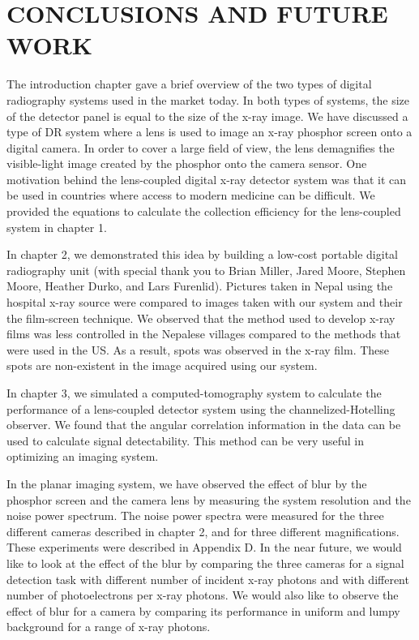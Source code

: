 \chapter{CONCLUSIONS AND FUTURE WORK}
The introduction chapter gave a brief overview of the two types of digital radiography systems used in the market today.  In both types of systems, the size of the detector panel is equal to the size of the x-ray image.  We have discussed a type of DR system where a lens is used to image an x-ray phosphor screen onto a digital camera.  In order to cover a large field of view, the lens demagnifies the visible-light image created by the phosphor onto the camera sensor.  One motivation behind the lens-coupled digital x-ray detector system was that it can be used in countries where access to modern medicine can be difficult.  We provided the equations to calculate the collection efficiency for the lens-coupled system in chapter 1.  

In chapter 2, we demonstrated this idea by building a low-cost portable digital radiography unit (with special thank you to Brian Miller, Jared Moore, Stephen Moore, Heather Durko, and Lars Furenlid).  Pictures taken in Nepal using the hospital x-ray source were compared to images taken with our system and their the film-screen technique.  We observed that the method used to develop x-ray films was less controlled in the Nepalese villages compared to the methods that were used in the US.  As a result, spots was observed in the x-ray film.  These spots are non-existent in the image acquired using our system.  

In chapter 3, we simulated a computed-tomography system to calculate the performance of a lens-coupled detector system using the channelized-Hotelling observer.  We found that the angular correlation information in the data can be used to calculate signal detectability.  This method can be very useful in optimizing an imaging system.  

In the planar imaging system, we have observed the effect of blur by the phosphor screen and the camera lens by measuring the system resolution and the noise power spectrum.  The noise power spectra were measured for the three different cameras described in chapter 2, and for three different magnifications.  These experiments were described in Appendix D.  In the near future, we would like to look at the effect of the blur by comparing the three cameras for a signal detection task with different number of incident x-ray photons and with different number of photoelectrons per x-ray photons.  We would also like to observe the effect of blur for a camera by comparing its performance in uniform and lumpy background for a range of x-ray photons.

